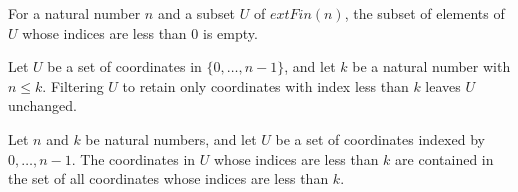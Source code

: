 \begin{theorem}
\label{FABL.prefixFrequency_zero}
\leanok
{}
For a natural number $n$ and a subset $U$ of $	ext{Fin}(n)$, the subset of elements of
$U$ whose indices are less than $0$ is empty.
\end{theorem}

\begin{theorem}
\label{FABL.prefixFrequency_eq_self}
\leanok
{}
Let $U$ be a set of coordinates in $\{0,\ldots,n-1\}$, and let $k$ be a natural number
with $n\le k$. Filtering $U$ to retain only coordinates with index less than $k$ leaves
$U$ unchanged.
\end{theorem}

\begin{theorem}
\label{FABL.prefixFrequency_subset_prefixCoordinates}
\leanok
{}
Let $n$ and $k$ be natural numbers, and let $U$ be a set of coordinates indexed by
$0,\ldots,n-1$. The coordinates in $U$ whose indices are less than $k$ are contained in
the set of all coordinates whose indices are less than $k$.
\end{theorem}


